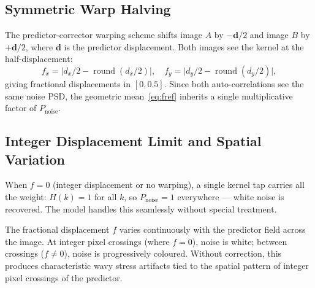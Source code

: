\documentclass[11pt,a4paper]{article}
\newcommand{\Pnoise}{P_\mathrm{noise}}
\begin{document}
\subsection{Symmetric Warp Halving}

The predictor-corrector warping scheme shifts image $A$ by $-\mathbf{d}/2$ and image $B$ by $+\mathbf{d}/2$, where $\mathbf{d}$ is the predictor displacement.
Both images see the kernel at the half-displacement:
%
\begin{equation}
    f_x = \bigl\lvert d_x/2 - \operatorname{round}(d_x/2) \bigr\rvert, \quad
    f_y = \bigl\lvert d_y/2 - \operatorname{round}(d_y/2) \bigr\rvert,
    \label{eq:frac_distance}
\end{equation}
%
giving fractional displacements in $[0, 0.5]$.
Since both auto-correlations see the same noise PSD, the geometric mean~\eqref{eq:fref} inherits a single multiplicative factor of $\Pnoise$.

\subsection{Integer Displacement Limit and Spatial Variation}

When $f = 0$ (integer displacement or no warping), a single kernel tap carries all the weight: $H(k) = 1$ for all $k$, so $\Pnoise = 1$ everywhere --- white noise is recovered.
The model handles this seamlessly without special treatment.

The fractional displacement $f$ varies continuously with the predictor field across the image.
At integer pixel crossings (where $f = 0$), noise is white; between crossings ($f \neq 0$), noise is progressively coloured.
Without correction, this produces characteristic wavy stress artifacts tied to the spatial pattern of integer pixel crossings of the predictor.
\end{document}
